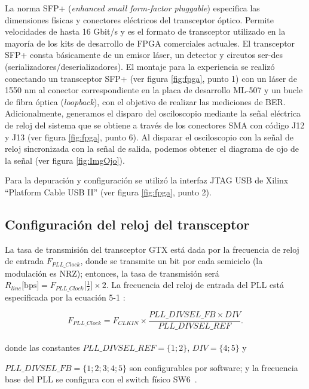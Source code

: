 La norma SFP+ \cite{sff4sff} (\textit{enhanced small form-factor pluggable}) especifica las dimensiones físicas y conectores eléctricos del transceptor óptico. Permite velocidades de hasta 16 Gbit/s y es el formato de transceptor utilizado en la mayoría de los kits de desarrollo de FPGA comerciales actuales.
El transceptor SFP+ consta básicamente de un emisor láser, un detector y circutos ser-des (serializadores/deserializadores).
El montaje para la experiencia se realizó conectando un transceptor SFP+ (ver figura \ref{fig:fpga}, punto 1) con un láser de 1550 nm 
al conector correspondiente en la placa de desarrollo ML-507 y un bucle de
fibra óptica ({\em loopback}), con el objetivo de realizar las mediciones de BER. Adicionalmente, generamos el disparo del
osciloscopio mediante la señal eléctrica de reloj del sistema que
se obtiene a través de los conectores SMA con código J12 y J13 (ver figura \ref{fig:fpga}, punto 6).  
Al disparar el osciloscopio con la señal de reloj sincronizada con la señal de salida, podemos obtener el diagrama de ojo de la señal (ver figura \ref{fig:ImgOjo}).

Para la depuración y configuración se utilizó la interfaz JTAG USB de Xilinx ``Platform Cable
USB II'' \cite{XilJtag} (ver figura \ref{fig:fpga}, punto 2).


\subsection{Configuración del reloj del transceptor}

La tasa de transmisión del transceptor GTX está dada por la
frecuencia de reloj de entrada $F_{PLL\_Clock}$, donde se transmite un
bit por cada semiciclo (la modulación es NRZ); entonces, la tasa de
transmisión será
$R_{line}\mbox{[bps]}=F_{PLL\_Clock}\mbox{[$\frac{1}{s}$]} \times 2$.  La
frecuencia del reloj de entrada del PLL está especificada por la ecuación
5-1 \cite{ug198}:

\begin{equation}
F_{PLL\_Clock} = F_{CLKIN} \times \frac{PLL\_DIVSEL\_FB \times
DIV}{PLL\_DIVSEL\_REF}.%
\end{equation}\\

donde las constantes $PLL\_DIVSEL\_REF = \{1;2\}$, $DIV = \{4;5\} $ y

$PLL\_DIVSEL\_FB = \{1;2;3;4;5\}$ son configurables por software;
y la frecuencia base del PLL se configura con el switch físico
SW6~\cite[Tabla 1-32]{ug347}.


